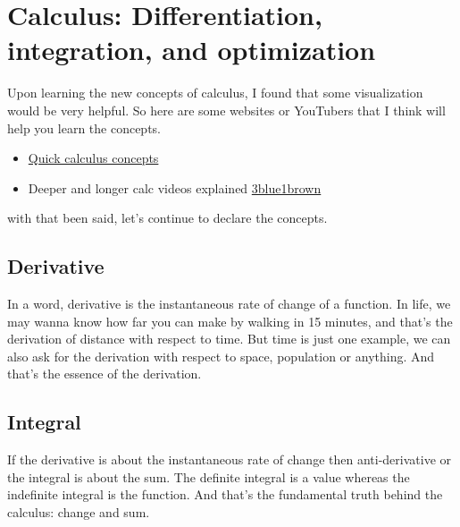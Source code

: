 \documentclass{article}
\begin{document}
\section{Calculus: Differentiation, integration, and optimization}
Upon learning the new concepts of calculus, I found that some visualization would be very helpful. So here are some websites or YouTubers that I think will help you learn the concepts.
\begin{itemize}
    \item  \href{https://www.mathsisfun.com/calculus/index.html}{Quick calculus concepts }
    \item Deeper and longer calc videos explained \href{https://www.3blue1brown.com/topics/calculus}{3blue1brown}
\end{itemize}
with that been said, let's continue to declare the concepts.

\subsection{Derivative}
In a word, derivative is the instantaneous rate of change of a function. In life, we may wanna know how far you can make by walking in 15 minutes, and that's the derivation of distance with respect to time. But time is just one example, we can also ask for the derivation with respect to space, population or anything. And that's the essence of the derivation.

\subsection{Integral}
If the derivative is about the instantaneous rate of change then anti-derivative or the integral is about the sum. The definite integral is a value whereas the indefinite integral is the function. And that's the fundamental truth behind the calculus: change and sum.
\end{document}
